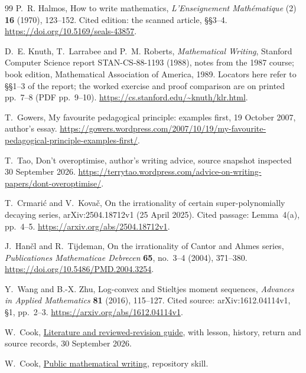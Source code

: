 \begin{thebibliography}{99}
P.~R. Halmos, How to write mathematics, \emph{L'Enseignement Math\'ematique}
(2) \textbf{16} (1970), 123--152. Cited edition: the scanned article,
\S\S3--4. \url{https://doi.org/10.5169/seals-43857}.

D.~E. Knuth, T.~Larrabee and P.~M. Roberts, \emph{Mathematical Writing},
Stanford Computer Science report STAN-CS-88-1193 (1988), notes from the
1987 course; book edition, Mathematical Association of America, 1989.
Locators here refer to \S\S1--3 of the report; the worked exercise and
proof comparison are on printed pp.~7--8 (PDF pp.~9--10).
\url{https://cs.stanford.edu/~knuth/klr.html}.

T.~Gowers, My favourite pedagogical principle: examples first,
19 October 2007, author's essay.
\url{https://gowers.wordpress.com/2007/10/19/my-favourite-pedagogical-principle-examples-first/}.

T.~Tao, Don't overoptimise, author's writing advice,
source snapshot inspected 30 September 2026.
\url{https://terrytao.wordpress.com/advice-on-writing-papers/dont-overoptimise/}.

T.~Crmari\'c and V.~Kova\v{c}, On the irrationality of certain
super-polynomially decaying series, arXiv:2504.18712v1 (25 April 2025).
Cited passage: Lemma~4(a), pp.~4--5.
\url{https://arxiv.org/abs/2504.18712v1}.

J.~Han\v{c}l and R.~Tijdeman, On the irrationality of Cantor and Ahmes series,
\emph{Publicationes Mathematicae Debrecen} \textbf{65}, no.~3--4
(2004), 371--380. \url{https://doi.org/10.5486/PMD.2004.3254}.

Y.~Wang and B.-X. Zhu, Log-convex and Stieltjes moment sequences,
\emph{Advances in Applied Mathematics} \textbf{81} (2016), 115--127.
Cited source: arXiv:1612.04114v1, \S1, pp.~2--3.
\url{https://arxiv.org/abs/1612.04114v1}.

W.~Cook, \href{https://github.com/wcook04/plectis-erdos/tree/main/docs/papers/exposition-method}{Literature and reviewed-revision guide},
with lesson, history, return and source records, 30 September 2026.

W.~Cook, \href{https://github.com/wcook04/plectis-erdos/blob/main/skills/public-mathematical-writing/SKILL.md}{Public mathematical writing}, repository skill.


\end{thebibliography}
